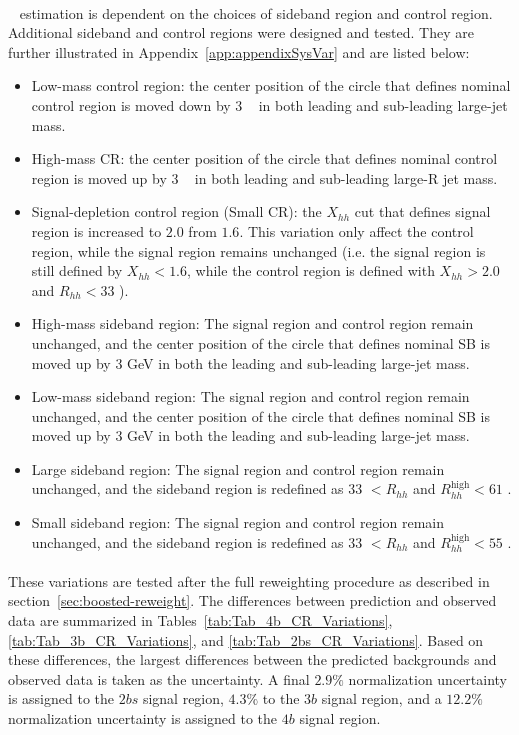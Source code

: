 \paragraph{}
\muqcd~ estimation is dependent on the choices of sideband region and control region.
Additional sideband and control regions were designed and tested. 
They are further illustrated in Appendix~\ref{app:appendixSysVar} and are listed below:
\begin{itemize}
	\item Low-mass control region: the center position of the circle that defines nominal control region is moved down by $3$ \GeV~ in both leading and sub-leading large-jet mass.
	\item High-mass CR: the center position of the circle that defines nominal control region is moved up by $3$ \GeV~ in both leading and sub-leading large-R jet mass.
	\item Signal-depletion control region (Small CR): the $X_{hh}$ cut that defines signal region is increased to $2.0$ from $1.6$. This variation only affect the control region, while the signal region remains unchanged (i.e. the signal region is still defined by $X_{hh}<1.6$, while the control region is defined with $X_{hh}>2.0$ and $R_{hh}<33$ \GeV).
	\item High-mass sideband region: The signal region and control region remain unchanged, and the center position of the circle that defines nominal SB is moved up by 3 GeV in both the leading and sub-leading large-\R jet mass.
	\item Low-mass sideband region: The signal region and control region remain unchanged, and the center position of the circle that defines nominal SB is moved up by 3 GeV in both the leading and sub-leading large-\R jet mass.
	\item Large sideband region: The signal region and control region remain unchanged, and the sideband region is redefined as $33$ \GeV $< R_{hh}$ and $ R_{hh}^{\text{high}} < 61$ \GeV. 
	\item Small sideband region: The signal region and control region remain unchanged, and the sideband region is redefined as $33$ \GeV $< R_{hh}$ and $ R_{hh}^{\text{high}} < 55$ \GeV.
\end{itemize}

\paragraph{} 
These variations are tested after the full reweighting procedure as described in section~\ref{sec:boosted-reweight}.
The differences between prediction and observed data are summarized in Tables~\ref{tab:Tab_4b_CR_Variations}, \ref{tab:Tab_3b_CR_Variations}, and \ref{tab:Tab_2bs_CR_Variations}.
Based on these differences, the largest differences between the predicted backgrounds and observed data is taken as the uncertainty.
A final $2.9\%$ normalization uncertainty is assigned to the $2bs$ signal region, $4.3\%$ to the $3b$ signal region, and a $12.2\%$ normalization uncertainty is assigned to the $4b$ signal region.

